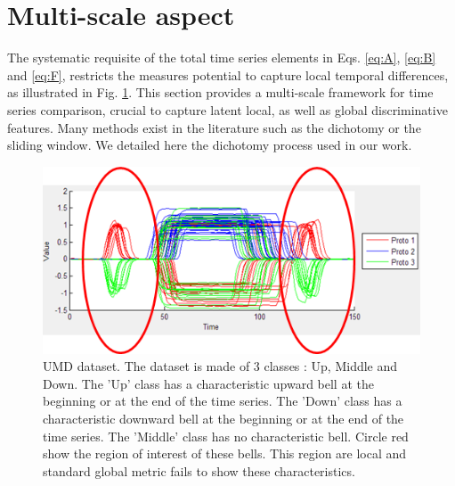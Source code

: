 \section{Multi-scale aspect}
The systematic requisite of  the total time series elements in Eqs. \ref{eq:A}, \ref{eq:B} and \ref{eq:F},  restricts the measures potential  to capture local  temporal differences, as illustrated in Fig. \ref{fig:UMD}. This section provides a multi-scale framework for time series comparison, crucial to capture latent local, as well as global discriminative features. Many methods exist in the literature such as the dichotomy or the sliding window. We detailed here the dichotomy process used in our work.

\begin{figure}[h!]
\centering
\includegraphics[width=0.7\linewidth]{images/UMD}
\caption{UMD dataset. The dataset is made of 3 classes : Up, Middle and Down. The 'Up' class has a characteristic upward bell at the beginning or at the end of the time series. The 'Down' class has a characteristic downward bell at the beginning or at the end of the time series. The 'Middle' class has no characteristic bell. Circle red show the region of interest of these bells. This region are local and standard global metric fails to show these characteristics.}
\label{fig:UMD}
\end{figure}

